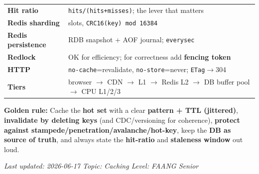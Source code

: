 \documentclass[11pt]{article}
\begin{document}
\begin{longtable}[]{@{}
  >{\raggedright\arraybackslash}p{}
  >{\raggedright\arraybackslash}p{}@{}}
\textbf{Hit ratio} & \texttt{hits/(hits+misses)}; the lever that matters \\
\rowcolor{zebra}
\textbf{Redis sharding} & 16384 slots, \texttt{CRC16(key)\ mod\ 16384} \\
\textbf{Redis persistence} & RDB snapshot + AOF journal; \texttt{everysec} \\
\rowcolor{zebra}
\textbf{Redlock} & OK for efficiency; for correctness add \textbf{fencing token} \\
\textbf{HTTP} & \texttt{no-cache}=revalidate, \texttt{no-store}=never; \texttt{ETag}\(\rightarrow\)304 \\
\rowcolor{zebra}
\textbf{Tiers} & browser \(\rightarrow\) CDN \(\rightarrow\) L1 \(\rightarrow\) Redis L2 \(\rightarrow\) DB buffer pool \(\rightarrow\) CPU L1/2/3 \\
\end{longtable}

\textbf{Golden rule:} Cache the \textbf{hot set} with a clear \textbf{pattern + TTL (jittered)}, \textbf{invalidate by deleting keys} (and CDC/versioning for coherence), \textbf{protect against stampede/penetration/avalanche/hot-key}, keep the \textbf{DB as source of truth}, and always state the \textbf{hit-ratio} and \textbf{staleness window} out loud.

\emph{Last updated: 2026-06-17 \textbar{} Topic: Caching \textbar{} Level: FAANG Senior}
\end{document}
